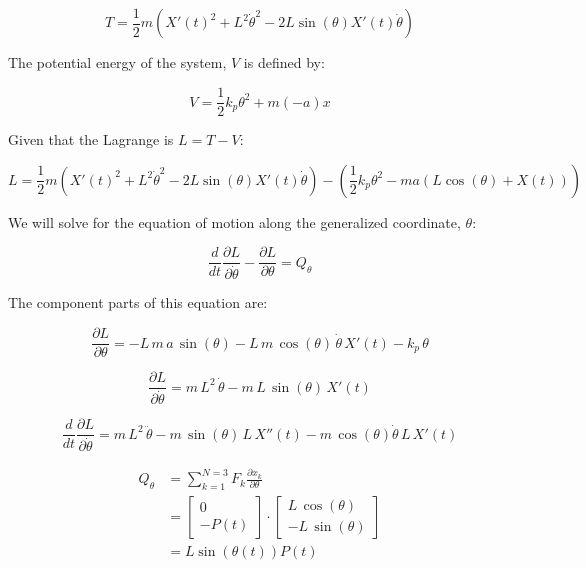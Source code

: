\documentclass[12pt, letterpaper]{../assignment}
\begin{document}
$$ T = \frac{1}{2} m \left(X'(t)^2 + L^2\dot{\theta}^2 - 2 L \sin(\theta)X'(t)\dot{\theta}\right)  $$

The potential energy of the system, $V$ is defined by:

$$ V = \frac{1}{2} k_p \theta^2 + m (-a) x $$


Given that the Lagrange is $ L = T - V $:

$$ L = \frac{1}{2} m \left(X'(t)^2 + L^2\dot{\theta}^2 - 2 L \sin(\theta)X'(t)\dot{\theta}\right)- \left( \frac{1}{2} k_p \theta^2 - m a \left(L\cos(\theta)+X(t)\right) \right)$$

We will solve for the equation of motion along the generalized coordinate, $\theta$:

$$ \frac{d}{d t} \frac{\partial L}{\partial \dot{\theta}} - \frac{\partial L}{\partial \theta} = Q_\theta $$

The component parts of this equation are:




$$ \frac{\partial L}{\partial \theta} = 
-L\,m\,a\,\sin\left(\theta\right)-L\,m\,\cos\left(\theta\right)\,\dot{\theta}\,X'\left(t\right)-k_{p}\,\theta  $$

$$ \frac{\partial L}{\partial \dot{\theta}}  =
m\,L^2\,\dot{\theta}-m\,L\,\sin\left(\theta\right)\,X'\left(t\right) $$


$$ \frac{d}{d t} \frac{\partial L}{\partial \dot{\theta}} =
m\,L^2\,\ddot{\theta} - m\,\sin(\theta)\,L\,X''(t) - m\,\cos(\theta)\dot{\theta}\,L\,X'(t)  $$


\begin{equation*}
\begin{aligned}
Q_\theta &= \sum_{k=1}^{N=3} F_k \frac{\partial x_k }{\partial \theta}\\
&=\left[\begin{array}{r} 0\\ -P\left(t\right) \end{array}\right] \cdot \left[\begin{array}{r} L\,\cos\left(\theta \right)\\ -L\,\sin\left(\theta \right) \end{array}\right]\\
&= L\sin(\theta(t)) P(t)
\end{aligned}
\end{equation*}
\end{document}
